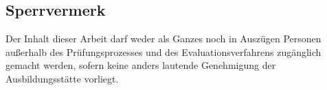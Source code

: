 \begin{centering}
\section*{Sperrvermerk}
\end{centering}
Der Inhalt dieser Arbeit darf weder als Ganzes noch in Auszügen Personen
außerhalb des Prüfungsprozesses und des Evaluationsverfahrens zugänglich
gemacht werden, sofern keine anders lautende Genehmigung der Ausbildungsstätte
vorliegt.
\clearpage
